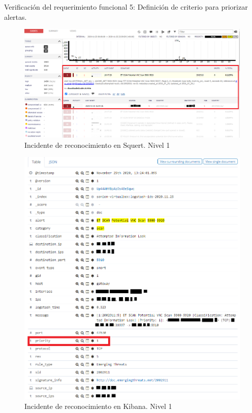 \begin{section}{Verificación del requerimiento funcional 5: Definición de criterio para priorizar alertas.}
    \begin{figure}[H]
        \centering
        \includegraphics[width=1\textwidth]{./iteracion_3_imagenes/squert_ataque_vnc_L1-EDITADO.png}
        \caption{Incidente de reconocimiento en Squert. Nivel 1}
        \label{fig:squert-L1}
    \end{figure}
    \begin{figure}[H]
        \centering
        \includegraphics[width=1\textwidth]{./iteracion_3_imagenes/kibana_ataques_L2_2-EDITADO.png}
        \caption{Incidente de reconocimiento en Kibana. Nivel 1}
        \label{fig:kibana-L1}
    \end{figure}
    
    \end{section}
    

